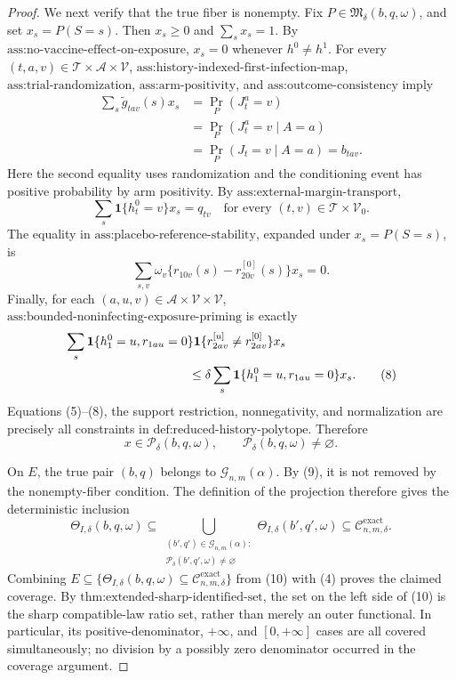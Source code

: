 \documentclass{article}
\begin{document}
\begin{proof}
We next verify that the true fiber is nonempty. Fix \(P\in\mathfrak M_\delta(b,q,\omega)\), and set \(x_s=P(S=s)\). Then \(x_s\geq0\) and \(\sum_sx_s=1\). By \(\text{ass:no-vaccine-effect-on-exposure}\), \(x_s=0\) whenever \(h^0\neq h^1\). For every \((t,a,v)\in\mathcal T\times\mathcal A\times\mathcal V\), \(\text{ass:history-indexed-first-infection-map}\), \(\text{ass:trial-randomization}\), \(\text{ass:arm-positivity}\), and \(\text{ass:outcome-consistency}\) imply
\[
 \begin{aligned}
 \sum_s\widetilde g_{tav}(s)x_s
 &=\Pr_P(J_t^a=v)\\
 &=\Pr_P(J_t^a=v\mid A=a)\\
 &=\Pr_P(J_t=v\mid A=a)
 =b_{tav}. \tag{5}
 \end{aligned}
\]
Here the second equality uses randomization and the conditioning event has positive probability by arm positivity. By \(\text{ass:external-margin-transport}\),
\[
 \sum_s\mathbf 1\{h_t^0=v\}x_s=q_{tv}
 \quad\text{for every }(t,v)\in\mathcal T\times\mathcal V_0. \tag{6}
\]
The equality in \(\text{ass:placebo-reference-stability}\), expanded under \(x_s=P(S=s)\), is
\[
 \sum_{s,v}\omega_v\{r_{10v}(s)-r^{[0]}_{20v}(s)\}x_s=0. \tag{7}
\]
Finally, for each \((a,u,v)\in\mathcal A\times\mathcal V\times\mathcal V\), \(\text{ass:bounded-noninfecting-exposure-priming}\) is exactly
\[
 \begin{aligned}
 &\sum_s\mathbf 1\{h_1^0=u,r_{1au}=0\}
          \mathbf 1\{r^{[u]}_{2av}\neq r^{[0]}_{2av}\}x_s\\
 &\hspace{35mm}\leq
 \delta\sum_s\mathbf 1\{h_1^0=u,r_{1au}=0\}x_s. \tag{8}
 \end{aligned}
\]
Equations (5)--(8), the support restriction, nonnegativity, and normalization are precisely all constraints in \(\text{def:reduced-history-polytope}\). Therefore
\[
 x\in\mathcal P_\delta(b,q,\omega),
 \qquad
 \mathcal P_\delta(b,q,\omega)\neq\varnothing. \tag{9}
\]

On \(E\), the true pair \((b,q)\) belongs to \(\mathcal G_{n,m}(\alpha)\). By (9), it is not removed by the nonempty-fiber condition. The definition of the projection therefore gives the deterministic inclusion
\[
 \Theta_{I,\delta}(b,q,\omega)
 \subseteq
 \bigcup_{\substack{(b',q')\in\mathcal G_{n,m}(\alpha):\\
                     \mathcal P_\delta(b',q',\omega)\neq\varnothing}}
 \Theta_{I,\delta}(b',q',\omega)
 \subseteq\mathcal C_{n,m,\delta}^{\mathrm{exact}}. \tag{10}
\]
Combining \(E\subseteq\{\Theta_{I,\delta}(b,q,\omega)\subseteq\mathcal C_{n,m,\delta}^{\mathrm{exact}}\}\) from (10) with (4) proves the claimed coverage. By \(\text{thm:extended-sharp-identified-set}\), the set on the left side of (10) is the sharp compatible-law ratio set, rather than merely an outer functional. In particular, its positive-denominator, \(+\infty\), and \([0,+\infty]\) cases are all covered simultaneously; no division by a possibly zero denominator occurred in the coverage argument.


\end{proof}
\end{document}
